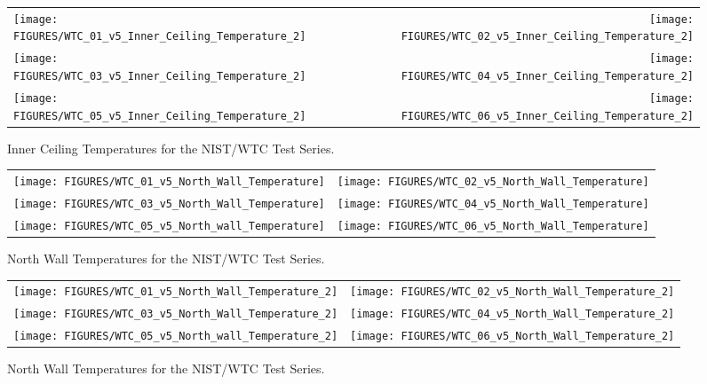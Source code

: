 \begin{figure}[p]
\begin{tabular*}{\textwidth}{l@{\extracolsep{\fill}}r}
\texttt{[image: FIGURES/WTC\_01\_v5\_Inner\_Ceiling\_Temperature\_2]} &
\texttt{[image: FIGURES/WTC\_02\_v5\_Inner\_Ceiling\_Temperature\_2]} \\
\texttt{[image: FIGURES/WTC\_03\_v5\_Inner\_Ceiling\_Temperature\_2]} &
\texttt{[image: FIGURES/WTC\_04\_v5\_Inner\_Ceiling\_Temperature\_2]} \\
\texttt{[image: FIGURES/WTC\_05\_v5\_Inner\_Ceiling\_Temperature\_2]} &
\texttt{[image: FIGURES/WTC\_06\_v5\_Inner\_Ceiling\_Temperature\_2]}
\end{tabular*}
\caption{Inner Ceiling Temperatures for the NIST/WTC Test Series.}
\label{NIST_WTC Inner_Ceiling_Temp_2}
\end{figure}

\begin{figure}[p]
\begin{tabular*}{\textwidth}{l@{\extracolsep{\fill}}r}
\texttt{[image: FIGURES/WTC\_01\_v5\_North\_Wall\_Temperature]} &
\texttt{[image: FIGURES/WTC\_02\_v5\_North\_Wall\_Temperature]} \\
\texttt{[image: FIGURES/WTC\_03\_v5\_North\_Wall\_Temperature]} &
\texttt{[image: FIGURES/WTC\_04\_v5\_North\_Wall\_Temperature]} \\
\texttt{[image: FIGURES/WTC\_05\_v5\_North\_wall\_Temperature]} &
\texttt{[image: FIGURES/WTC\_06\_v5\_North\_Wall\_Temperature]}
\end{tabular*}
\caption{North Wall Temperatures for the NIST/WTC Test Series.}
\label{NIST_WTC North_Wall_Temp}
\end{figure}

\begin{figure}[p]
\begin{tabular*}{\textwidth}{l@{\extracolsep{\fill}}r}
\texttt{[image: FIGURES/WTC\_01\_v5\_North\_Wall\_Temperature\_2]} &
\texttt{[image: FIGURES/WTC\_02\_v5\_North\_Wall\_Temperature\_2]} \\
\texttt{[image: FIGURES/WTC\_03\_v5\_North\_Wall\_Temperature\_2]} &
\texttt{[image: FIGURES/WTC\_04\_v5\_North\_Wall\_Temperature\_2]} \\
\texttt{[image: FIGURES/WTC\_05\_v5\_North\_wall\_Temperature\_2]} &
\texttt{[image: FIGURES/WTC\_06\_v5\_North\_Wall\_Temperature\_2]}
\end{tabular*}
\caption{North Wall Temperatures for the NIST/WTC Test Series.}
\label{NIST_WTC North_Wall_Temp_2}
\end{figure}

